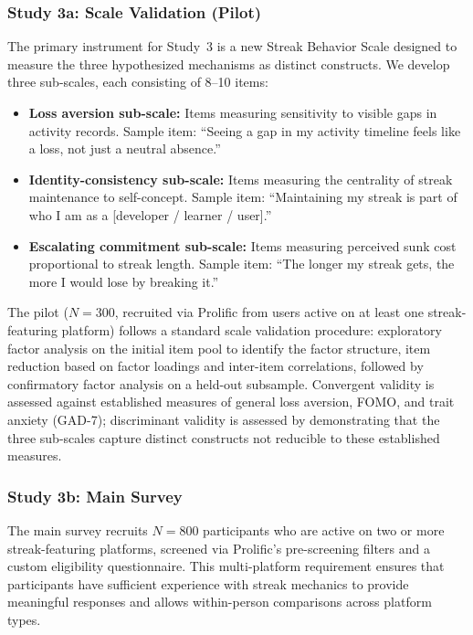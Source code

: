\documentclass[12pt]{article}
\begin{document}
\subsubsection{Study 3a: Scale Validation (Pilot)}
\label{sec:study3a}

The primary instrument for Study~3 is a new Streak Behavior Scale designed to measure the three hypothesized mechanisms as distinct constructs. We develop three sub-scales, each consisting of 8--10 items:

\begin{itemize}
    \item \textbf{Loss aversion sub-scale:} Items measuring sensitivity to visible gaps in activity records. Sample item: ``Seeing a gap in my activity timeline feels like a loss, not just a neutral absence.''
    \item \textbf{Identity-consistency sub-scale:} Items measuring the centrality of streak maintenance to self-concept. Sample item: ``Maintaining my streak is part of who I am as a [developer / learner / user].''
    \item \textbf{Escalating commitment sub-scale:} Items measuring perceived sunk cost proportional to streak length. Sample item: ``The longer my streak gets, the more I would lose by breaking it.''
\end{itemize}

The pilot ($N = 300$, recruited via Prolific from users active on at least one streak-featuring platform) follows a standard scale validation procedure: exploratory factor analysis on the initial item pool to identify the factor structure, item reduction based on factor loadings and inter-item correlations, followed by confirmatory factor analysis on a held-out subsample. Convergent validity is assessed against established measures of general loss aversion, FOMO, and trait anxiety (GAD-7); discriminant validity is assessed by demonstrating that the three sub-scales capture distinct constructs not reducible to these established measures.

\subsubsection{Study 3b: Main Survey}
\label{sec:study3b}

The main survey recruits $N = 800$ participants who are active on two or more streak-featuring platforms, screened via Prolific's pre-screening filters and a custom eligibility questionnaire. This multi-platform requirement ensures that participants have sufficient experience with streak mechanics to provide meaningful responses and allows within-person comparisons across platform types.
\end{document}
